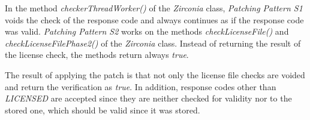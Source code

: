 In the method \textit{checkerThreadWorker()} of the \textit{Zirconia} class, \textit{Patching Pattern S1} voids the check of the response code and always continues as if the response code was valid.
\newline
\textit{Patching Pattern S2} works on the methods \textit{checkLicenseFile()} and \textit{checkLicenseFilePhase2()} of the \textit{Zirconia} class.
Instead of returning the result of the license check, the methods return always \textit{true}.
\newline

The result of applying the patch is that not only the license file checks are voided and return the verification as \textit{true}.
In addition, response codes other than \textit{LICENSED} are accepted since they are neither checked for validity nor to the stored one, which should be valid since it was stored.
